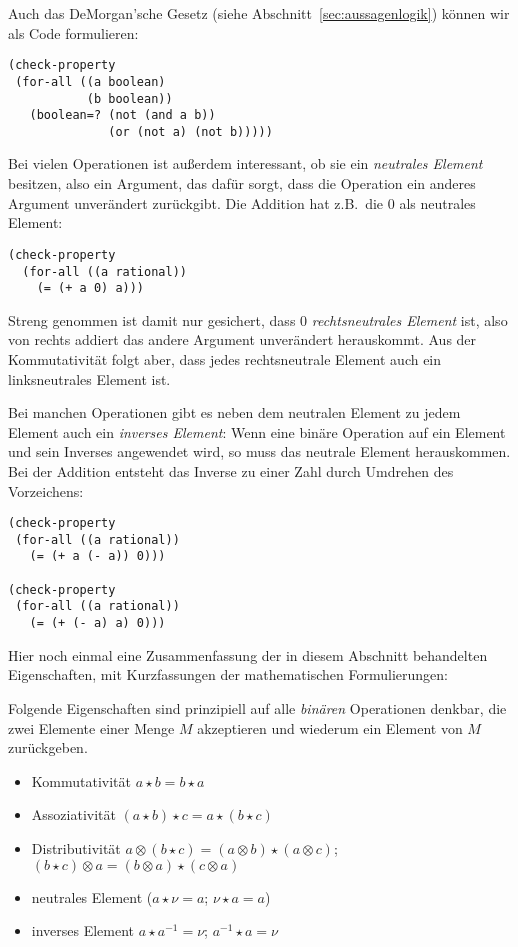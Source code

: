 Auch das \textrm{DeMorgan'sche Gesetz}
(siehe Abschnitt~\ref{sec:aussagenlogik}) können wir als Code
formulieren:
%
\begin{lstlisting}
(check-property
 (for-all ((a boolean)
           (b boolean))
   (boolean=? (not (and a b))
              (or (not a) (not b)))))
\end{lstlisting}
%
Bei vielen Operationen ist außerdem interessant, ob sie ein
\textit{neutrales Element} besitzen, also ein
Argument, das dafür sorgt, dass die Operation ein anderes Argument
unverändert zurückgibt.  Die Addition hat z.B.\ die $0$ als neutrales
Element:
%
\begin{lstlisting}
(check-property
  (for-all ((a rational))
    (= (+ a 0) a)))
\end{lstlisting}
%
Streng genommen ist damit nur gesichert, dass $0$ \textit{rechtsneutrales
  Element} ist, also von rechts addiert das andere Argument
unverändert herauskommt.  Aus der Kommutativität folgt aber, dass jedes
rechtsneutrale Element auch ein linksneutrales Element ist.

Bei manchen Operationen gibt es neben dem neutralen Element zu jedem
Element auch ein \textit{inverses Element}:
Wenn eine binäre Operation auf ein Element und sein Inverses
angewendet wird, so muss das neutrale Element herauskommen.  Bei der
Addition entsteht das Inverse zu einer Zahl durch Umdrehen des
Vorzeichens:
%
\begin{lstlisting}
(check-property
 (for-all ((a rational))
   (= (+ a (- a)) 0)))

(check-property
 (for-all ((a rational))
   (= (+ (- a) a) 0)))
\end{lstlisting}
%
Hier noch einmal eine Zusammenfassung der in diesem Abschnitt
behandelten Eigenschaften, mit Kurzfassungen der mathematischen
Formulierungen:

\begin{mantra}
%
Folgende Eigenschaften sind prinzipiell auf alle \textit{binären}
Operationen denkbar, die zwei Elemente einer Menge $M$ akzeptieren
und wiederum ein Element von $M$ zurückgeben.
\begin{itemize}
\item Kommutativität $a \star b = b \star a$
\item Assoziativität $(a \star b) \star c = a \star (b \star c)$
\item Distributivität $a \otimes (b \star c) = (a \otimes b) \star (a
  \otimes c)$; $(b \star c) \otimes a = (b \otimes a) \star (c
  \otimes a)$
\item neutrales Element ($a\star \nu = a$; $\nu\star a = a$)
\item inverses Element $a\star a^{-1} = \nu$; $a^{-1}\star a = \nu$
\end{itemize}
\end{mantra}


